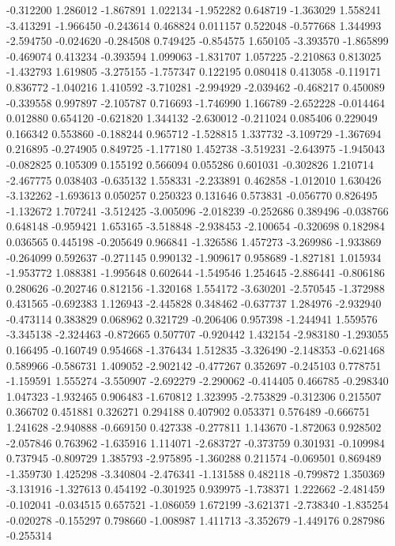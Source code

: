 -0.312200
1.286012
-1.867891
1.022134
-1.952282
0.648719
-1.363029
1.558241
-3.413291
-1.966450
-0.243614
0.468824
0.011157
0.522048
-0.577668
1.344993
-2.594750
-0.024620
-0.284508
0.749425
-0.854575
1.650105
-3.393570
-1.865899
-0.469074
0.413234
-0.393594
1.099063
-1.831707
1.057225
-2.210863
0.813025
-1.432793
1.619805
-3.275155
-1.757347
0.122195
0.080418
0.413058
-0.119171
0.836772
-1.040216
1.410592
-3.710281
-2.994929
-2.039462
-0.468217
0.450089
-0.339558
0.997897
-2.105787
0.716693
-1.746990
1.166789
-2.652228
-0.014464
0.012880
0.654120
-0.621820
1.344132
-2.630012
-0.211024
0.085406
0.229049
0.166342
0.553860
-0.188244
0.965712
-1.528815
1.337732
-3.109729
-1.367694
0.216895
-0.274905
0.849725
-1.177180
1.452738
-3.519231
-2.643975
-1.945043
-0.082825
0.105309
0.155192
0.566094
0.055286
0.601031
-0.302826
1.210714
-2.467775
0.038403
-0.635132
1.558331
-2.233891
0.462858
-1.012010
1.630426
-3.132262
-1.693613
0.050257
0.250323
0.131646
0.573831
-0.056770
0.826495
-1.132672
1.707241
-3.512425
-3.005096
-2.018239
-0.252686
0.389496
-0.038766
0.648148
-0.959421
1.653165
-3.518848
-2.938453
-2.100654
-0.320698
0.182984
0.036565
0.445198
-0.205649
0.966841
-1.326586
1.457273
-3.269986
-1.933869
-0.264099
0.592637
-0.271145
0.990132
-1.909617
0.958689
-1.827181
1.015934
-1.953772
1.088381
-1.995648
0.602644
-1.549546
1.254645
-2.886441
-0.806186
0.280626
-0.202746
0.812156
-1.320168
1.554172
-3.630201
-2.570545
-1.372988
0.431565
-0.692383
1.126943
-2.445828
0.348462
-0.637737
1.284976
-2.932940
-0.473114
0.383829
0.068962
0.321729
-0.206406
0.957398
-1.244941
1.559576
-3.345138
-2.324463
-0.872665
0.507707
-0.920442
1.432154
-2.983180
-1.293055
0.166495
-0.160749
0.954668
-1.376434
1.512835
-3.326490
-2.148353
-0.621468
0.589966
-0.586731
1.409052
-2.902142
-0.477267
0.352697
-0.245103
0.778751
-1.159591
1.555274
-3.550907
-2.692279
-2.290062
-0.414405
0.466785
-0.298340
1.047323
-1.932465
0.906483
-1.670812
1.323995
-2.753829
-0.312306
0.215507
0.366702
0.451881
0.326271
0.294188
0.407902
0.053371
0.576489
-0.666751
1.241628
-2.940888
-0.669150
0.427338
-0.277811
1.143670
-1.872063
0.928502
-2.057846
0.763962
-1.635916
1.114071
-2.683727
-0.373759
0.301931
-0.109984
0.737945
-0.809729
1.385793
-2.975895
-1.360288
0.211574
-0.069501
0.869489
-1.359730
1.425298
-3.340804
-2.476341
-1.131588
0.482118
-0.799872
1.350369
-3.131916
-1.327613
0.454192
-0.301925
0.939975
-1.738371
1.222662
-2.481459
-0.102041
-0.034515
0.657521
-1.086059
1.672199
-3.621371
-2.738340
-1.835254
-0.020278
-0.155297
0.798660
-1.008987
1.411713
-3.352679
-1.449176
0.287986
-0.255314
